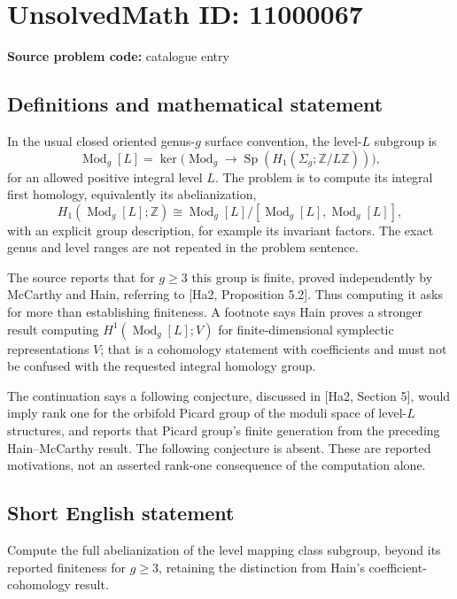 \documentclass[11pt]{article}
\newcommand{\Z}{\mathbb{Z}}
\begin{document}
\section*{UnsolvedMath ID: 11000067}
\textbf{Source problem code:} catalogue entry
\subsection{Definitions and mathematical statement}
In the usual closed oriented genus-\(g\) surface convention, the level-\(L\) subgroup is
\[
 \operatorname{Mod}_g[L]
 =\ker\bigl(\operatorname{Mod}_g\longrightarrow
       \operatorname{Sp}(H_1(\Sigma_g;\Z/L\Z))\bigr),
\]
for an allowed positive integral level \(L\). The problem is to compute its integral first homology, equivalently its abelianization,
\[
 H_1(\operatorname{Mod}_g[L];\Z)
 \cong\operatorname{Mod}_g[L]/[\operatorname{Mod}_g[L],\operatorname{Mod}_g[L]],
\]
with an explicit group description, for example its invariant factors. The exact genus and level ranges are not repeated in the problem sentence.

The source reports that for \(g\geq3\) this group is finite, proved independently by McCarthy and Hain, referring to [Ha2, Proposition 5.2]. Thus computing it asks for more than establishing finiteness. A footnote says Hain proves a stronger result computing \(H^1(\operatorname{Mod}_g[L];V)\) for finite-dimensional symplectic representations \(V\); that is a cohomology statement with coefficients and must not be confused with the requested integral homology group.

The continuation says a following conjecture, discussed in [Ha2, Section 5], would imply rank one for the orbifold Picard group of the moduli space of level-\(L\) structures, and reports that Picard group's finite generation from the preceding Hain--McCarthy result. The following conjecture is absent. These are reported motivations, not an asserted rank-one consequence of the computation alone.
\subsection{Short English statement}
Compute the full abelianization of the level mapping class subgroup, beyond its reported finiteness for \(g\geq3\), retaining the distinction from Hain's coefficient-cohomology result.
\end{document}
